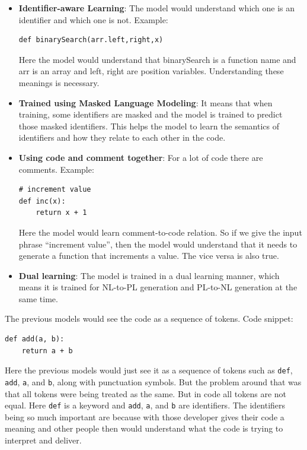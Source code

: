 \documentclass[12pt]{article}
\begin{document}
\begin{itemize}
	\item \textbf{Identifier-aware Learning}: The model would understand which one is an identifier and which one is not. Example:
	\begin{lstlisting}
def binarySearch(arr.left,right,x)
	\end{lstlisting}
	Here the model would understand that binarySearch is a function name and arr is an array and left, right are position variables. Understanding these meanings is necessary.
	\item \textbf{Trained using Masked Language Modeling}: 
	It means that when training, some identifiers are masked and the model is trained to predict those masked identifiers. This helps the model to learn the semantics of identifiers and how they relate to each other in the code.
	\item \textbf{Using code and comment together}: For a lot of code there are comments. Example:
	\begin{lstlisting}
# increment value
def inc(x):
	return x + 1
	\end{lstlisting}
	Here the model would learn comment-to-code relation. So if we give the input phrase ``increment value'', then the model would understand that it needs to generate a function that increments a value. The vice versa is also true.
	\item \textbf{Dual learning}: The model is trained in a dual learning manner, which means it is trained for NL-to-PL generation and PL-to-NL generation at the same time.
\end{itemize}
The previous models would see the code as a sequence of tokens.
Code snippet:
\begin{lstlisting}
def add(a, b):
	return a + b
\end{lstlisting}
Here the previous models would just see it as a sequence of tokens such as \texttt{def}, \texttt{add}, \texttt{a}, and \texttt{b}, along with punctuation symbols. But the problem around that was that all tokens were being treated as the same. But in code all tokens are not equal. Here \texttt{def} is a keyword and \texttt{add}, \texttt{a}, and \texttt{b} are identifiers. The identifiers being so much important are because with those developer gives their code a meaning and other people then would understand what the code is trying to interpret and deliver.
\end{document}
